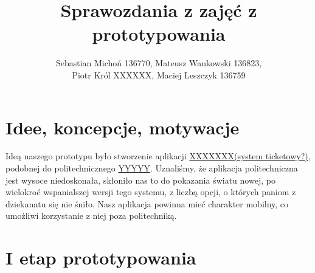 \documentclass[12pt]{article}
\begin{document}
\title{Sprawozdania z zajęć z prototypowania}
\author{Sebastian Michoń 136770, Mateusz Wankowski 136823,\\ Piotr Król XXXXXX, Maciej Leszczyk 136759}
\date{\vspace{-3ex}}
\maketitle

\section{Idee, koncepcje, motywacje}
Ideą naszego prototypu było stworzenie aplikacji \underline{XXXXXXX(system ticketowy?)}, podobnej do politechnicznego \underline{YYYYY}. Uznaliśmy, że aplikacja politechniczna jest wysoce niedoskonała, skłoniło nas to do pokazania światu nowej, po wielokroć wspanialszej wersji tego systemu, z liczbą opcji, o których paniom z dziekanatu się nie śniło. Nasz aplikacja powinna mieć charakter mobilny, co umożliwi korzystanie z niej poza politechniką.

\section{I etap prototypowania}
\end{document}
